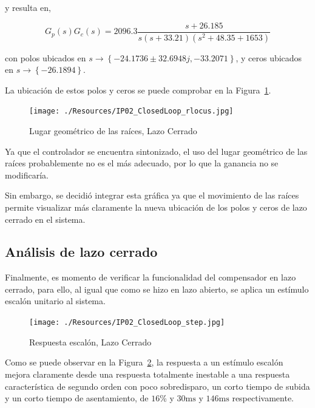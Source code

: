 \documentclass[12pt,a4paper]{article}
\begin{document}
    y resulta en, 

    \begin{equation}
      G_{p}\left(s\right)G_{c}\left(s\right) = 2096.3 \dfrac{s + 26.185}{s \left( s + 33.21 \right) \left(s^{2} + 48.35 + 1653\right)}
    \end{equation}

    con polos ubicados en \( s \longrightarrow \left\{-24.1736 \pm 32.6948 j, -33.2071\right\} \),  
    y ceros ubicados en \( s \longrightarrow \left\{-26.1894\right\} \).

    La ubicación de estos polos y ceros se puede comprobar en la Figura~\ref{fig:compd_system:closed_loop_root_locus}. 

    \begin{figure}
      \centering
      \texttt{[image: ./Resources/IP02\_ClosedLoop\_rlocus.jpg]}
      \caption{Lugar geométrico de las raíces, Lazo Cerrado}
      \label{fig:compd_system:closed_loop_root_locus}
    \end{figure}

    Ya que el controlador se encuentra sintonizado, el uso del lugar geométrico de las raíces probablemente no es 
    el más adecuado, por lo que la ganancia no se modificaría. 

    Sin embargo, se decidió integrar esta gráfica ya que el movimiento de las raíces permite visualizar más 
    claramente la nueva ubicación de los polos y ceros de lazo cerrado en el sistema. 

    \subsection{Análisis de lazo cerrado}

      Finalmente, es momento de verificar la funcionalidad del compensador en lazo cerrado, para ello, al igual 
      que como se hizo en lazo abierto, se aplica un estímulo escalón unitario al sistema. 

      \begin{figure}
        \centering
        \texttt{[image: ./Resources/IP02\_ClosedLoop\_step.jpg]}
        \caption{Respuesta escalón, Lazo Cerrado}
        \label{fig:compd_system:closed_loop_step}
      \end{figure}

    Como se puede observar en la Figura~\ref{fig:compd_system:closed_loop_step}, la respuesta a un estímulo escalón 
    mejora claramente desde una respuesta totalmente inestable a una respuesta característica de segundo orden con 
    poco sobredisparo, un corto tiempo de subida y un corto tiempo de asentamiento, de \( 16 \)\% y 
    \( 30\si{\milli\second} \) y \( 146\si{\milli\second} \) respectivamente.
\end{document}
